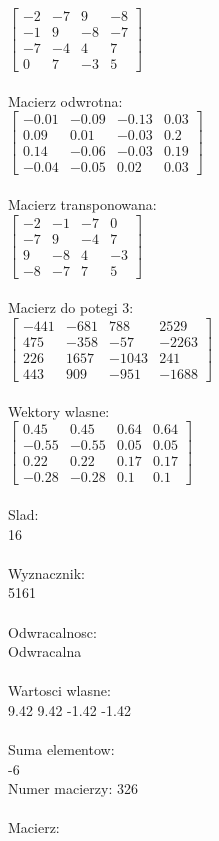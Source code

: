 \documentclass[a4paper,12pt]{article}
\begin{document}
$\begin{bmatrix} -2&-7&9&-8\\-1&9&-8&-7\\-7&-4&4&7\\0&7&-3&5 \end{bmatrix}$
\\
\\
Macierz odwrotna:\\

$\begin{bmatrix} -0.01&-0.09&-0.13&0.03\\0.09&0.01&-0.03&0.2\\0.14&-0.06&-0.03&0.19\\-0.04&-0.05&0.02&0.03 \end{bmatrix}$
\\
\\
Macierz transponowana:\\

$\begin{bmatrix} -2&-1&-7&0\\-7&9&-4&7\\9&-8&4&-3\\-8&-7&7&5 \end{bmatrix}$
\\
\\
Macierz do potegi 3:\\

$\begin{bmatrix} -441&-681&788&2529\\475&-358&-57&-2263\\226&1657&-1043&241\\443&909&-951&-1688 \end{bmatrix}$
\\
\\
Wektory wlasne:\\

$\begin{bmatrix} 0.45&0.45&0.64&0.64\\-0.55&-0.55&0.05&0.05\\0.22&0.22&0.17&0.17\\-0.28&-0.28&0.1&0.1 \end{bmatrix}$
\\
\\
Slad:\\
16
\\
\\
Wyznacznik:\\
5161
\\
\\
Odwracalnosc:\\
Odwracalna
\\
\\
Wartosci wlasne:\\
9.42 9.42 -1.42 -1.42
\\
\\
Suma elementow:\\
-6
\\
\newpage
Numer macierzy:
326
\\
\\
Macierz:\\
\end{document}
